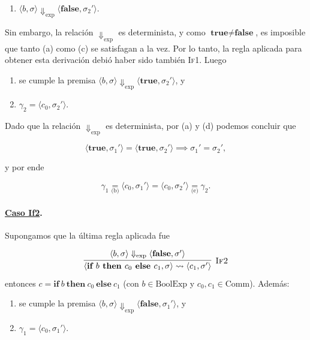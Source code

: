 \documentclass[12pt, a4paper]{article}
\begin{document}
\begin{enumerate}
    \item[c.] $\langle b,\sigma\rangle
    \Downarrow_{\mathrm{exp}}
    \langle \textbf{false},\sigma_2'\rangle$.
\end{enumerate}
Sin embargo, la relación $\Downarrow_{\mathrm{exp}}$ es determinista, y como $\textbf{true} \neq \textbf{false}$, es imposible que tanto (a) como (c) se satisfagan a la vez. Por lo tanto, la regla aplicada para obtener esta derivación debió haber sido también \textsc{If1}. Luego

\begin{enumerate}[itemsep=0pt]
    \item[d.] se cumple la premisa $\langle b,\sigma\rangle
    \Downarrow_{\mathrm{exp}}
    \langle \textbf{true},\sigma_2'\rangle$, y

    \item[e.] $\gamma_2
    =
    \langle c_0,\sigma_2'\rangle$.
\end{enumerate}

Dado que la relación $\Downarrow_{\mathrm{exp}}$ es determinista, por (a) y (d) podemos concluir que

\[
\langle \textbf{true},\sigma_1'\rangle
=
\langle \textbf{true},\sigma_2'\rangle
\implies
\sigma_1'=\sigma_2',
\]

y por ende

\[
\gamma_1
\underset{\text{(b)}}{=}
\langle c_0,\sigma_1'\rangle
=
\langle c_0,\sigma_2'\rangle
\underset{\text{(e)}}{=}
\gamma_2.
\]


\paragraph{\underline{Caso If2}.}
Supongamos que la última regla aplicada fue

\[
  \infer[\textsc{If2}]{\langle \textbf{if } b \textbf{ then } c_0 \textbf{ else } c_1, \sigma \rangle \rightsquigarrow \langle c_1, \sigma' \rangle}{\langle b, \sigma \rangle \Downarrow_{\text{exp}} \langle \textbf{false}, \sigma' \rangle}
\]
entonces $c = \textbf{if}\ b\ \textbf{then}\ c_0\ \textbf{else}\ c_1$ (con $b\in\mathrm{BoolExp}$ y $c_0,c_1\in\mathrm{Comm}$). Además:
\begin{enumerate}
    \item[a.] se cumple la premisa $\langle b,\sigma\rangle
    \Downarrow_{\mathrm{exp}}
    \langle \textbf{false},\sigma_1'\rangle$, y

    \item[b.] $\gamma_1
    =
    \langle c_0,\sigma_1'\rangle$.
\end{enumerate}
\end{document}
